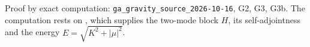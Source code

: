 Proof by exact computation: \texttt{ga\_gravity\_source\_2026-10-16}, G2, G3, G3b. The computation rests on , which supplies the two-mode block $H$, its self-adjointness and the energy $E = \sqrt{K^2 + |\mu|^2}$.
